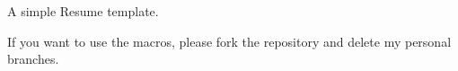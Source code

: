 \documentclass[10pt]{scrartcl}
\begin{document}
A simple Resume template.

If you want to use the macros, please fork the repository and delete my personal branches.
\end{document}
